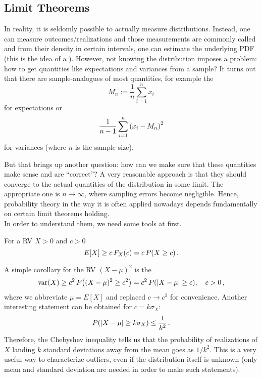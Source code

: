 	\subsection{Limit Theorems}\label{subsec:limit_thms}
In reality, it is seldomly possible to actually measure distributions. Instead, one can measure outcomes/realizations and those measurements are commonly called  and from their density in certain intervals, one can estimate the underlying PDF (this is the idea of a ). However, not knowing the distribution imposes a problem: how to get quantities like expectations and variances from a sample? It turns out that there are sample-analogues of most quantities, for example the 
\begin{equation}\label{eq:sample_mean}
M_n := \frac{1}{n} \sum_{i = 1}^n x_i
\end{equation}
for expectations or
\begin{equation}
\frac{1}{n - 1} \sum_{i = 1}^n \qty(x_i - M_n)^2
\end{equation}
for variances (where $n$ is the sample size).


But that brings up another question: how can we make sure that these quantities make sense and are \enquote{correct}? A very reasonable approach is that they should converge to the actual quantities of the distribution in some limit. The appropriate one is $n \rightarrow \infty$, where sampling errors become negligible. Hence, probability theory in the way it is often applied nowadays depends fundamentally on certain limit theorems holding.\\


In order to understand them, we need some tools at first.
\begin{prop}
For a RV $X > 0$ and $c > 0$
\begin{equation}
E[X] \geq c \, F_X(c) = c \, P\qty(X \geq c) \, .
\end{equation}
\end{prop}
A simple corollary for the RV $(X - \mu)^2$ is the 
\begin{equation}\label{eq:cor_markov}
\operatorname{var}(X) \geq c^2 \, P\qty((X - \mu)^2 \geq c^2) = c^2 \, P\qty(\abs{X - \mu} \geq c), \quad c > 0 \, ,
\end{equation}
where we abbreviate $\mu = E[X]$ and replaced $c \rightarrow c^2$ for convenience. Another interesting statement can be obtained for $c = k \sigma_X$:
\begin{equation}
P\qty(\abs{X - \mu} \geq k \sigma_X) \leq \frac{1}{k^2} \, .
\end{equation}
Therefore, the Chebyshev inequality tells us that the probability of realizations of $X$ landing $k$ standard deviations away from the mean goes as $1 / k^2$. This is a very useful way to characterize outliers, even if the distribution itself is unknown (only mean and standard deviation are needed in order to make such statements).\\


